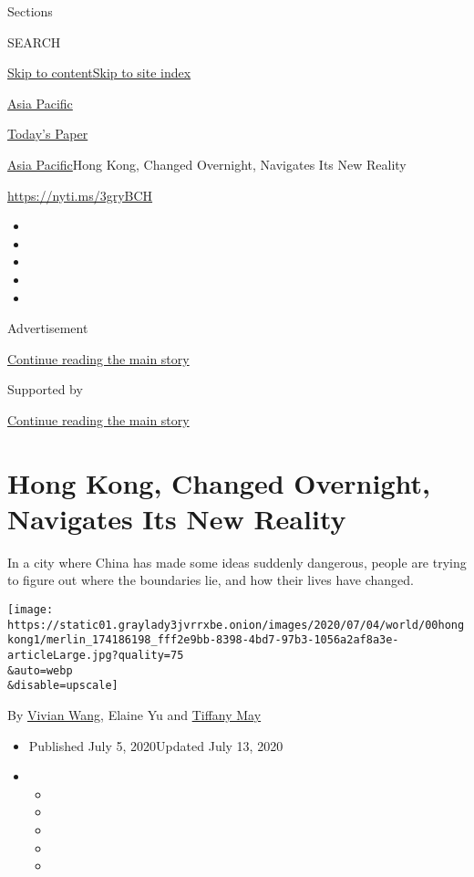 Sections

SEARCH

\protect\hyperlink{site-content}{Skip to
content}\protect\hyperlink{site-index}{Skip to site index}

\href{https://www.nytimes3xbfgragh.onion/section/world/asia}{Asia
Pacific}

\href{https://myaccount.nytimes3xbfgragh.onion/auth/login?response_type=cookie\&client_id=vi}{}

\href{https://www.nytimes3xbfgragh.onion/section/todayspaper}{Today's
Paper}

\href{/section/world/asia}{Asia Pacific}\textbar{}Hong Kong, Changed
Overnight, Navigates Its New Reality

\href{https://nyti.ms/3gryBCH}{https://nyti.ms/3gryBCH}

\begin{itemize}
\item
\item
\item
\item
\item
\end{itemize}

Advertisement

\protect\hyperlink{after-top}{Continue reading the main story}

Supported by

\protect\hyperlink{after-sponsor}{Continue reading the main story}

\hypertarget{hong-kong-changed-overnight-navigates-its-new-reality}{%
\section{Hong Kong, Changed Overnight, Navigates Its New
Reality}\label{hong-kong-changed-overnight-navigates-its-new-reality}}

In a city where China has made some ideas suddenly dangerous, people are
trying to figure out where the boundaries lie, and how their lives have
changed.

\texttt{[image: https://static01.graylady3jvrrxbe.onion/images/2020/07/04/world/00hongkong1/merlin\_174186198\_fff2e9bb-8398-4bd7-97b3-1056a2af8a3e-articleLarge.jpg?quality=75\\\&auto=webp\\\&disable=upscale]}

By \href{https://www.nytimes3xbfgragh.onion/by/vivian-wang}{Vivian
Wang}, Elaine Yu and
\href{https://www.nytimes3xbfgragh.onion/by/tiffany-may}{Tiffany May}

\begin{itemize}
\item
  Published July 5, 2020Updated July 13, 2020
\item
  \begin{itemize}
  \item
  \item
  \item
  \item
  \item
  \end{itemize}
\end{itemize}

